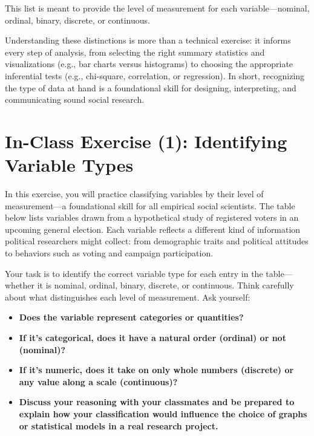 \documentclass[
  letterpaper,
  DIV=11,
  numbers=noendperiod]{scrreprt}
\providecommand{\tightlist}{%
  \setlength{\itemsep}{0pt}\setlength{\parskip}{0pt}}
\begin{document}
This list is meant to provide the level of measurement for each
variable---nominal, ordinal, binary, discrete, or continuous.

Understanding these distinctions is more than a technical exercise: it
informs every step of analysis, from selecting the right summary
statistics and visualizations (e.g., bar charts versus histograms) to
choosing the appropriate inferential tests (e.g., chi-square,
correlation, or regression). In short, recognizing the type of data at
hand is a foundational skill for designing, interpreting, and
communicating sound social research.

\section{In-Class Exercise (1): Identifying Variable
Types}\label{in-class-exercise-1-identifying-variable-types}

In this exercise, you will practice classifying variables by their level
of measurement---a foundational skill for all empirical social
scientists. The table below lists variables drawn from a hypothetical
study of registered voters in an upcoming general election. Each
variable reflects a different kind of information political researchers
might collect: from demographic traits and political attitudes to
behaviors such as voting and campaign participation.

Your task is to identify the correct variable type for each entry in the
table---whether it is nominal, ordinal, binary, discrete, or continuous.
Think carefully about what distinguishes each level of measurement. Ask
yourself:

\begin{itemize}
\tightlist
\item
  \textbf{Does the variable represent categories or quantities? }
\item
  \textbf{If it's categorical, does it have a natural order (ordinal) or
  not (nominal)? }
\item
  \textbf{If it's numeric, does it take on only whole numbers (discrete)
  or any value along a scale (continuous)? }
\item
  \textbf{Discuss your reasoning with your classmates and be prepared to
  explain how your classification would influence the choice of graphs
  or statistical models in a real research project. }
\end{itemize}
\end{document}
